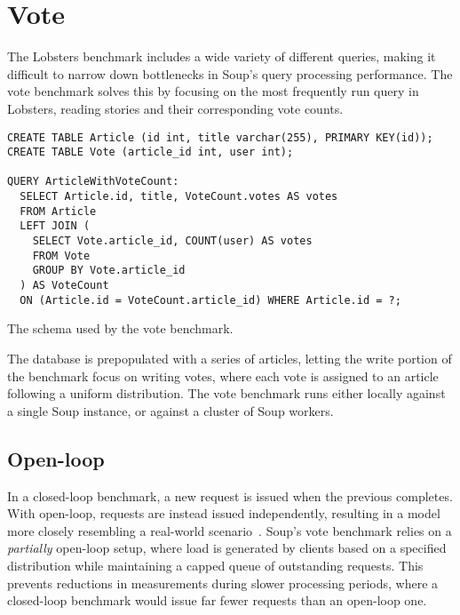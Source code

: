 \section{Vote}

The Lobsters benchmark includes a wide variety of different queries, making it
difficult to narrow down bottlenecks in Soup's query processing performance. The
vote benchmark solves this by focusing on the most frequently run query in
Lobsters, reading stories and their corresponding vote counts.

\begin{listing}[H]
  \begin{verbatim}
CREATE TABLE Article (id int, title varchar(255), PRIMARY KEY(id));
CREATE TABLE Vote (article_id int, user int);

QUERY ArticleWithVoteCount:
  SELECT Article.id, title, VoteCount.votes AS votes
  FROM Article
  LEFT JOIN (
    SELECT Vote.article_id, COUNT(user) AS votes
    FROM Vote
    GROUP BY Vote.article_id
  ) AS VoteCount
  ON (Article.id = VoteCount.article_id) WHERE Article.id = ?;
  \end{verbatim}

  \caption{The schema used by the vote benchmark.}\label{lst:vote}
\end{listing}

The database is prepopulated with a series of articles, letting the write
portion of the benchmark focus on writing votes, where each vote is assigned to
an article following a uniform distribution. The vote benchmark runs either
locally against a single Soup instance, or against a cluster of Soup workers.

\subsection{Open-loop}\label{sec:vote-open-loop}

In a closed-loop benchmark, a new request is issued when the previous completes.
With open-loop, requests are instead issued independently, resulting in a model
more closely resembling a real-world scenario~\cite{open-loop}. Soup's vote
benchmark relies on a \textit{partially} open-loop setup, where load is
generated by clients based on a specified distribution while maintaining a
capped queue of outstanding requests. This prevents reductions in measurements
during slower processing periods, where a closed-loop benchmark would issue far
fewer requests than an open-loop one.

